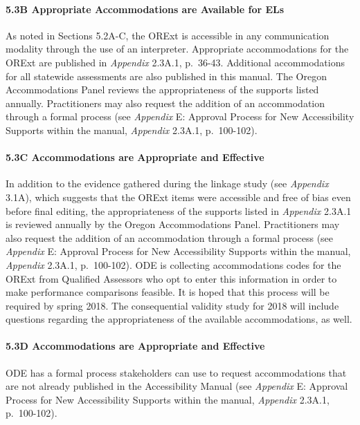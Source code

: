 \documentclass[]{article}
\let\oldparagraph\paragraph
\renewcommand{\paragraph}[1]{\oldparagraph{#1}\mbox{}}
\begin{document}
\paragraph{5.3B Appropriate Accommodations are Available for
ELs}\label{b-appropriate-accommodations-are-available-for-els}

As noted in Sections 5.2A-C, the ORExt is accessible in any
communication modality through the use of an interpreter. Appropriate
accommodations for the ORExt are published in \emph{Appendix} 2.3A.1,
p.~36-43. Additional accommodations for all statewide assessments are
also published in this manual. The Oregon Accommodations Panel reviews
the appropriateness of the supports listed annually. Practitioners may
also request the addition of an accommodation through a formal process
(see \emph{Appendix} E: Approval Process for New Accessibility Supports
within the manual, \emph{Appendix} 2.3A.1, p.~100-102).

\paragraph{5.3C Accommodations are Appropriate and
Effective}\label{c-accommodations-are-appropriate-and-effective}

In addition to the evidence gathered during the linkage study (see
\emph{Appendix} 3.1A), which suggests that the ORExt items were
accessible and free of bias even before final editing, the
appropriateness of the supports listed in \emph{Appendix} 2.3A.1 is
reviewed annually by the Oregon Accommodations Panel. Practitioners may
also request the addition of an accommodation through a formal process
(see \emph{Appendix} E: Approval Process for New Accessibility Supports
within the manual, \emph{Appendix} 2.3A.1, p.~100-102). ODE is
collecting accommodations codes for the ORExt from Qualified Assessors
who opt to enter this information in order to make performance
comparisons feasible. It is hoped that this process will be required by
spring 2018. The consequential validity study for 2018 will include
questions regarding the appropriateness of the available accommodations,
as well.

\paragraph{5.3D Accommodations are Appropriate and
Effective}\label{d-accommodations-are-appropriate-and-effective}

ODE has a formal process stakeholders can use to request accommodations
that are not already published in the Accessibility Manual (see
\emph{Appendix} E: Approval Process for New Accessibility Supports
within the manual, \emph{Appendix} 2.3A.1, p.~100-102).
\end{document}
